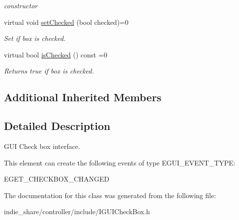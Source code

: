 \begin{DoxyCompactItemize}
\begin{DoxyCompactList}\small\item\em constructor \end{DoxyCompactList}\item 
\mbox{\label{classirr_1_1gui_1_1IGUICheckBox_ac57493d2d2ffbe820b0d634bd344d455}} 
virtual void \hyperlink{classirr_1_1gui_1_1IGUICheckBox_ac57493d2d2ffbe820b0d634bd344d455}{set\+Checked} (bool checked)=0
\begin{DoxyCompactList}\small\item\em Set if box is checked. \end{DoxyCompactList}\item 
\mbox{\label{classirr_1_1gui_1_1IGUICheckBox_a3c7bffd5a06af81ff894d08bdeaf72ca}} 
virtual bool \hyperlink{classirr_1_1gui_1_1IGUICheckBox_a3c7bffd5a06af81ff894d08bdeaf72ca}{is\+Checked} () const =0
\begin{DoxyCompactList}\small\item\em Returns true if box is checked. \end{DoxyCompactList}\end{DoxyCompactItemize}
\subsection*{Additional Inherited Members}


\subsection{Detailed Description}
G\+UI Check box interface. 

\begin{DoxyParagraph}{This element can create the following events of type E\+G\+U\+I\+\_\+\+E\+V\+E\+N\+T\+\_\+\+T\+Y\+PE\+:}
\begin{DoxyItemize}
\item E\+G\+E\+T\+\_\+\+C\+H\+E\+C\+K\+B\+O\+X\+\_\+\+C\+H\+A\+N\+G\+ED \end{DoxyItemize}

\end{DoxyParagraph}


The documentation for this class was generated from the following file\+:\begin{DoxyCompactItemize}
\item 
indie\+\_\+share/controller/include/I\+G\+U\+I\+Check\+Box.\+h\end{DoxyCompactItemize}
